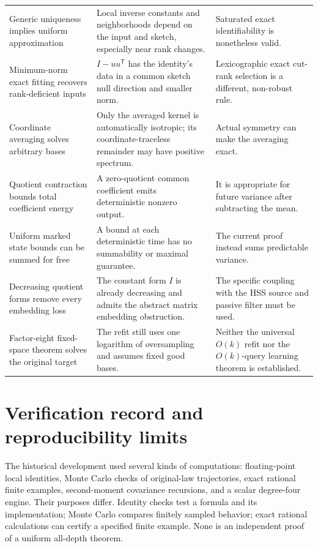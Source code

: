 \documentclass[11pt,oneside,openany,a4paper]{book}
\numberwithin{equation}{chapter}
\theoremstyle{definition}
\theoremstyle{remark}
\newcommand{\T}{\mathsf T}\newcommand{\Id}{I}
\begin{document}
\begin{longtable}{@{}>{\RaggedRight\arraybackslash}p{.29\linewidth}>{\RaggedRight\arraybackslash}p{.31\linewidth}>{\RaggedRight\arraybackslash}p{.33\linewidth}@{}}
Generic uniqueness implies uniform approximation&Local inverse constants and neighborhoods depend on the input and sketch, especially near rank changes.&Saturated exact identifiability is nonetheless valid.\\
Minimum-norm exact fitting recovers rank-deficient inputs&$I-uu^\T$ has the identity's data in a common sketch null direction and smaller norm.&Lexicographic exact cut-rank selection is a different, non-robust rule.\\
Coordinate averaging solves arbitrary bases&Only the averaged kernel is automatically isotropic; its coordinate-traceless remainder may have positive spectrum.&Actual symmetry can make the averaging exact.\\
Quotient contraction bounds total coefficient energy&A zero-quotient common coefficient emits deterministic nonzero output.&It is appropriate for future variance after subtracting the mean.\\
Uniform marked state bounds can be summed for free&A bound at each deterministic time has no summability or maximal guarantee.&The current proof instead sums predictable variance.\\
Decreasing quotient forms remove every embedding loss&The constant form $I$ is already decreasing and admits the abstract matrix embedding obstruction.&The specific coupling with the HSS source and passive filter must be used.\\
Factor-eight fixed-space theorem solves the original target&The refit still uses one logarithm of oversampling and assumes fixed good bases.&Neither the universal $O(k)$ refit nor the $O(k)$-query learning theorem is established.\\
\end{longtable}

\section{Verification record and reproducibility limits}\label{base:new:verification}
The historical development used several kinds of computations: floating-point local identities, Monte Carlo checks of original-law trajectories, exact rational finite examples, second-moment covariance recursions, and a scalar degree-four engine. Their purposes differ. Identity checks test a formula and its implementation; Monte Carlo compares finitely sampled behavior; exact rational calculations can certify a specified finite example. None is an independent proof of a uniform all-depth theorem.
\end{document}
